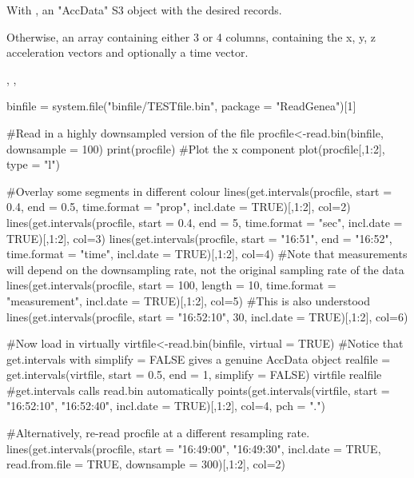 \documentclass[a4paper]{book}
\begin{document}
%
\begin{Value}
With , an "AccData" S3 object with the desired records.

Otherwise, an array containing either 3 or 4 columns, containing the x, y, z acceleration vectors and optionally a time vector.
\end{Value}
%
\begin{SeeAlso}\relax
{}, \code{\LinkA{[.AccData}{[.AccData}}, 
\end{SeeAlso}
%
\begin{Examples}
\begin{ExampleCode}

binfile  = system.file("binfile/TESTfile.bin", package = "ReadGenea")[1]

#Read in a highly downsampled version of the file
procfile<-read.bin(binfile, downsample = 100)
print(procfile)
#Plot the x component
plot(procfile[,1:2], type = "l")

#Overlay some segments in different colour
lines(get.intervals(procfile, start = 0.4, end = 0.5, time.format = "prop", incl.date = TRUE)[,1:2], col=2) 
lines(get.intervals(procfile, start = 0.4, end = 5, time.format = "sec", incl.date = TRUE)[,1:2], col=3) 
lines(get.intervals(procfile, start = "16:51", end = "16:52", time.format = "time", incl.date = TRUE)[,1:2], col=4) 
#Note that measurements will depend on the downsampling rate, not the original sampling rate of the data
lines(get.intervals(procfile, start = 100, length = 10, time.format = "measurement", incl.date = TRUE)[,1:2], col=5) 
#This is also understood
lines(get.intervals(procfile, start = "16:52:10", 30,  incl.date = TRUE)[,1:2], col=6) 

#Now load in virtually
virtfile<-read.bin(binfile, virtual = TRUE)
#Notice that get.intervals with simplify = FALSE gives a genuine AccData object
realfile = get.intervals(virtfile, start = 0.5, end = 1, simplify = FALSE)
virtfile
realfile
#get.intervals calls read.bin automatically
points(get.intervals(virtfile, start = "16:52:10", "16:52:40",  incl.date = TRUE)[,1:2], col=4, pch = ".") 

#Alternatively, re-read procfile at a different resampling rate.
lines(get.intervals(procfile, start = "16:49:00", "16:49:30",  incl.date = TRUE, read.from.file = TRUE, downsample = 300)[,1:2], col=2) 


\end{ExampleCode}
\end{Examples}
\end{document}
